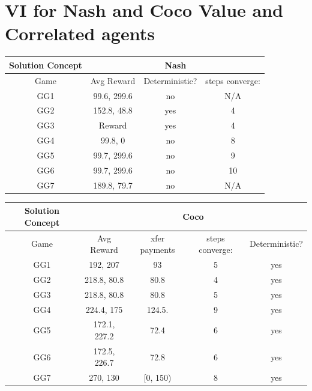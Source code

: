 \section{VI for Nash and Coco Value  and Correlated agents}
\hspace{5mm}\begin{tabular}{||c||c|c|c||}
	\hline
	Solution Concept&  \multicolumn{3}{|c||}{Nash} \\ \hline
	Game & Avg Reward & Deterministic? & steps converge:  \\ \hline \hline
	GG1 & 99.6, 299.6 & no & N/A  \\ \hline
	GG2 & 152.8, 48.8 & yes & 4  \\ \hline
	GG3 & Reward & yes & 4 \\ \hline
	GG4 & 99.8, 0 & no & 8 \\ \hline
	GG5 & 99.7, 299.6 & no & 9 \\ \hline
	GG6 & 99.7, 299.6 & no & 10 \\ \hline
	GG7 & 189.8, 79.7 & no & N/A \\ \hline
\end{tabular}

\vspace{10mm}

\hspace{5mm}\begin{tabular}{||c||c|c|c|c||}
	\hline
	Solution Concept& \multicolumn{4}{|c||}{Coco}  \\ \hline
	Game & Avg Reward & xfer payments & steps converge: & Deterministic? \\ \hline \hline
	GG1 & 192, 207 & 93 & 5 & yes\\ \hline
	GG2 & 218.8, 80.8 & 80.8 & 4 & yes\\ \hline
	GG3 & 218.8, 80.8 & 80.8 & 5 & yes \\ \hline
	GG4 & 224.4, 175 & 124.5. & 9 & yes \\ \hline
	GG5 & 172.1, 227.2 & 72.4 & 6 & yes\\ \hline
	GG6 & 172.5, 226.7 & 72.8 & 6 & yes\\ \hline
	GG7 & 270, 130 & [0, 150) & 8 & yes\\ \hline
	
	
\end{tabular}

\vspace{10mm}

